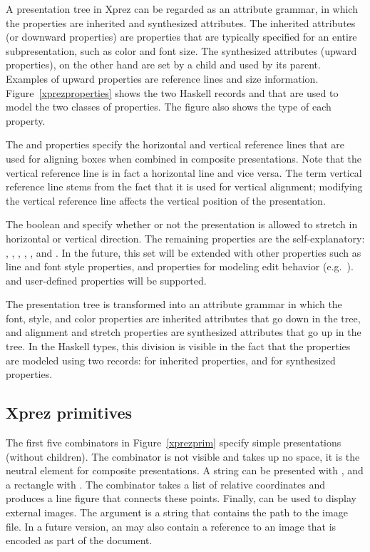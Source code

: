 A presentation tree in {Xprez} can be regarded as an attribute grammar, in which the properties are inherited and synthesized attributes. The inherited attributes (or downward properties) are properties that are typically specified for an entire subpresentation, such as color and font size. The synthesized attributes (upward properties), on the other hand are set by a child and used by its parent. Examples of upward properties are reference lines and size information. Figure~\ref{xprezproperties} shows the two Haskell records   and  that are used to model the two classes of properties. The figure also shows the type of each property. 

The  and  properties specify the horizontal and vertical reference lines that are used for aligning boxes when combined in composite presentations. Note that the vertical reference line is in fact a horizontal line and vice versa. The term vertical reference line stems from the fact that it is used for vertical alignment; modifying the vertical reference line affects the vertical position of the presentation. 

The boolean  and  specify whether or not the presentation is allowed to stretch in horizontal or vertical direction. The remaining properties are the self-explanatory: , , , , , and . In the future, this set will be extended with other properties such as line and font style properties, and properties for modeling edit behavior (e.g.\ ). \bc and user-defined properties will be supported. \ec

\bc
The presentation tree is transformed into an attribute grammar in which the font, style, and color properties are inherited attributes that go down in the tree, and alignment and stretch properties are synthesized attributes that go up in the tree. In the Haskell types, this division is visible in the fact that the properties are modeled using two records:  for inherited properties, and  for synthesized properties.
\ec

%																
\subsection{{\sc Xprez} primitives} \label{sect:primitives}

The first five combinators in Figure~\ref{xprezprim} specify simple presentations (without children). The  combinator is not visible and takes up no space, it is the neutral element for composite presentations. A string can be presented with , and a rectangle with . The  combinator takes a list of relative coordinates and produces a line figure that connects these points. Finally,  can be used to display external images. The argument is a string that contains the path to the image file. In a future version, an  may also contain a reference to an image that is encoded as part of the document.

